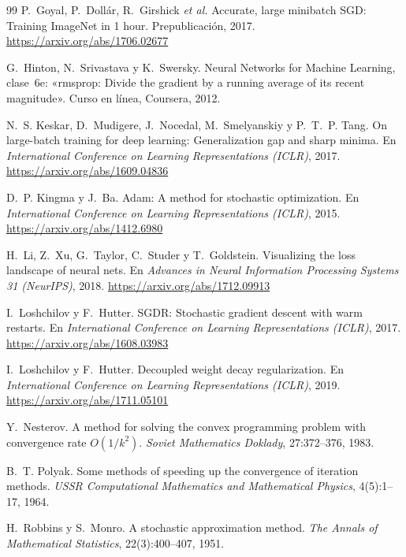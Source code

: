 \begin{thebibliography}{99}
P.~Goyal, P.~Dollár, R.~Girshick \emph{et al.}
\newblock Accurate, large minibatch SGD: Training ImageNet in 1 hour.
\newblock Prepublicación, 2017.
\newblock \url{https://arxiv.org/abs/1706.02677}

G.~Hinton, N.~Srivastava y K.~Swersky.
\newblock Neural Networks for Machine Learning, clase~6e: «rmsprop: Divide the gradient by a running average of its recent magnitude».
\newblock Curso en línea, Coursera, 2012.

N.~S. Keskar, D.~Mudigere, J.~Nocedal, M.~Smelyanskiy y P.~T.~P. Tang.
\newblock On large-batch training for deep learning: Generalization gap and sharp minima.
\newblock En \emph{International Conference on Learning Representations (ICLR)}, 2017.
\newblock \url{https://arxiv.org/abs/1609.04836}

D.~P. Kingma y J.~Ba.
\newblock Adam: A method for stochastic optimization.
\newblock En \emph{International Conference on Learning Representations (ICLR)}, 2015.
\newblock \url{https://arxiv.org/abs/1412.6980}

H.~Li, Z.~Xu, G.~Taylor, C.~Studer y T.~Goldstein.
\newblock Visualizing the loss landscape of neural nets.
\newblock En \emph{Advances in Neural Information Processing Systems 31 (NeurIPS)}, 2018.
\newblock \url{https://arxiv.org/abs/1712.09913}

I.~Loshchilov y F.~Hutter.
\newblock SGDR: Stochastic gradient descent with warm restarts.
\newblock En \emph{International Conference on Learning Representations (ICLR)}, 2017.
\newblock \url{https://arxiv.org/abs/1608.03983}

I.~Loshchilov y F.~Hutter.
\newblock Decoupled weight decay regularization.
\newblock En \emph{International Conference on Learning Representations (ICLR)}, 2019.
\newblock \url{https://arxiv.org/abs/1711.05101}

Y.~Nesterov.
\newblock A method for solving the convex programming problem with convergence rate $O(1/k^{2})$.
\newblock \emph{Soviet Mathematics Doklady}, 27:372--376, 1983.

B.~T. Polyak.
\newblock Some methods of speeding up the convergence of iteration methods.
\newblock \emph{USSR Computational Mathematics and Mathematical Physics}, 4(5):1--17, 1964.

H.~Robbins y S.~Monro.
\newblock A stochastic approximation method.
\newblock \emph{The Annals of Mathematical Statistics}, 22(3):400--407, 1951.


\end{thebibliography}
